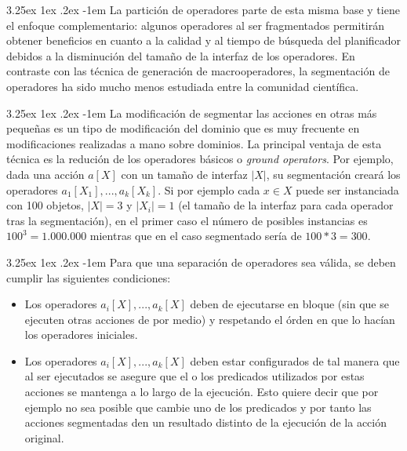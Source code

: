 \documentclass{article}
\makeatletter
\renewcommand\paragraph{\@startsection{paragraph}{5}{\z@}%
      {3.25ex \@plus1ex \@minus.2ex}%
      {-1em}%
      {\normalfont\normalsize\bfseries}}
\makeatother
\begin{document}
    \paragraph{}
    La partición de operadores parte de esta misma base y tiene el enfoque complementario: algunos operadores al ser fragmentados permitirán obtener beneficios en cuanto a la calidad y al tiempo de búsqueda del planificador debidos a la disminución del tamaño de la interfaz de los operadores. En contraste con las técnica de generación de macrooperadores, la segmentación de operadores ha sido mucho menos estudiada entre la comunidad científica.
    
    \paragraph{}
    La modificación de segmentar las acciones en otras más pequeñas es un tipo de modificación del dominio que es muy frecuente en modificaciones realizadas a mano sobre dominios. La principal ventaja de esta técnica es la redución de los operadores básicos o \textit{ground operators}. Por ejemplo, dada una acción $a[X]$ con un tamaño de interfaz $|X|$, su segmentación creará los operadores $a_1[X_1],...,a_k[X_k]$. Si por ejemplo cada $x \in X$ puede ser instanciada con 100 objetos, $|X|=3$ y $|X_i|=1$ (el tamaño de la interfaz para cada operador tras la segmentación), en el primer caso el número de posibles instancias es $100^3=1.000.000$ mientras que en el caso segmentado sería de $100*3=300$.
    
    \paragraph{}
    Para que una separación de operadores sea válida, se deben cumplir las siguientes condiciones:
    \begin{itemize}
        \item Los operadores $a_i[X],...,a_k[X]$ deben de ejecutarse en bloque (sin que se ejecuten otras acciones de por medio) y respetando el órden en que lo hacían los operadores iniciales.
        \item Los operadores $a_i[X],...,a_k[X]$ deben estar configurados de tal manera que al ser ejecutados se asegure que el o los predicados utilizados por estas acciones se mantenga a lo largo de la ejecución. Esto quiere decir que por ejemplo no sea posible que cambie uno de los predicados y por tanto las acciones segmentadas den un resultado distinto de la ejecución de la acción original.
    \end{itemize}
    
\end{document}
